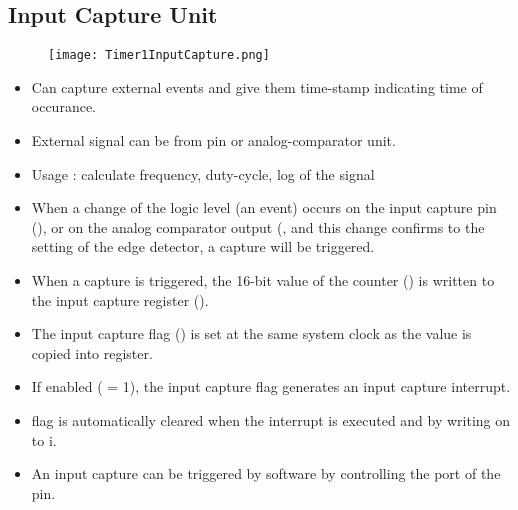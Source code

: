 \subsection{Input Capture Unit}
\begin{figure}[H]
    \centering
    \texttt{[image: Timer1InputCapture.png]}
\end{figure}
\begin{itemize}
    \item Can capture external events and give them time-stamp indicating time of occurance.
    \item External signal can be from  pin or analog-comparator unit.
    \item Usage : calculate frequency, duty-cycle, log of the signal
    \item When a change of the logic level (an event) occurs on the input capture pin (), or on the analog comparator output (, and this change confirms to the setting of the edge detector, a capture will be triggered. 
    \item When a capture is triggered, the 16-bit value of the counter () is written to the input capture register ().
    \item The input capture flag () is set at the same system clock as the  value is copied into  register. 
    \item If enabled ( = 1), the input capture flag generates an input capture interrupt.
    \item {} flag is automatically cleared when the interrupt is executed and by writing on to i.
    \item An input capture can be triggered by software by controlling the port of the  pin.
\end{itemize}

